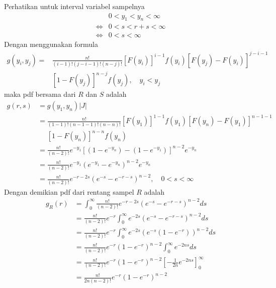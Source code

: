 \documentclass{exam}
\begin{document}
\begin{enumerate}
\begin{enumerate}
\begin{solution}
                Perhatikan untuk interval variabel sampelnya
                \begin{align*}
                    &0<y_1<y_n<\infty\\
                    \iff& 0<s<r+s<\infty\\
                    \iff& 0<s<\infty
                \end{align*}
                Dengan menggunakan formula
                \begin{align*}
                    g(y_i,y_j)=&\frac{n!}{(i-1)!(j-i-1)!(n-j)!}[F(y_i)]^{i-1}f(y_i)[F(y_j)-F(y_i)]^{j-i-1}\\
                    &[1-F(y_j)]^{n-j}f(y_j), \quad y_i<y_j
                \end{align*}
                maka pdf bersama dari $R$ dan $S$ adalah
                \begin{align*}
                    g(r,s) &= g(y_1,y_n)|J|\\
                    &= \frac{n!}{(1-1)!(n-1-1)!(n-n)!}[F(y_1)]^{1-1}f(y_1)[F(y_n)-F(y_1)]^{n-1-1}\\
                    &\quad\,\,[1-F(y_n)]^{n-n}f(y_n)\\
                    &=\frac{n!}{(n-2)!}e^{-y_1}[(1-e^{-y_n})-(1-e^{-y_1})]^{n-2}e^{-y_n}\\
                    &=\frac{n!}{(n-2)!}e^{-y_1}(e^{-y_1}-e^{-y_n})^{n-2}e^{-y_n}\\
                    &=\frac{n!}{(n-2)!}e^{-r-2s}(e^{-s}-e^{-r-s})^{n-2},\quad 0<s<\infty
                \end{align*}
                Dengan demikian pdf dari rentang sampel $R$ adalah
                \begin{align*}
                    g_R(r) &= \int_{0}^{\infty}\frac{n!}{(n-2)!}e^{-r-2s}(e^{-s}-e^{-r-s})^{n-2}ds\\
                    &= \frac{n!}{(n-2)!}e^{-r}\int_{0}^{\infty}e^{-2s}(e^{-s}-e^{-r-s})^{n-2}ds\\
                    &= \frac{n!}{(n-2)!}e^{-r}\int_{0}^{\infty}e^{-2s}(e^{-s}(1-e^{-r}))^{n-2}ds\\
                    &= \frac{n!}{(n-2)!}e^{-r}(1-e^{-r})^{n-2}\int_{0}^{\infty}e^{-2ns}ds\\
                    &= \frac{n!}{(n-2)!}e^{-r}(1-e^{-r})^{n-2}\left[-\frac{1}{2n}e^{-2ns}\right]_{0}^{\infty}\\
                    &= \frac{n!}{2n(n-2)!}e^{-r}(1-e^{-r})^{n-2}
                \end{align*}

\end{solution}
\end{enumerate}
\end{enumerate}
\end{document}

